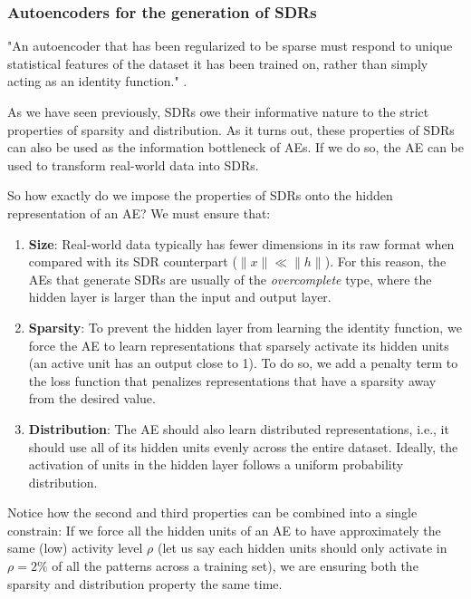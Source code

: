 \documentclass{article}
\begin{document}
\subsubsection{Autoencoders for the generation of SDRs}

"An autoencoder that has been regularized to be sparse must
respond to unique statistical features of the dataset it has been trained on, rather than simply acting as an identity function." \cite{bengio2017deep}.

As we have seen previously, SDRs owe their informative nature to the strict properties of sparsity and distribution. As it turns out, these properties of SDRs can also be used as the information bottleneck of AEs. If we do so, the AE can be used to transform real-world data into SDRs.

So how exactly do we impose the properties of SDRs onto the hidden representation of an AE? We must ensure that:
\begin{enumerate}
    \item \textbf{Size}: Real-world data typically has fewer dimensions in its raw format when compared with its SDR counterpart ($\|x\| \ll \|h\|$). For this reason, the AEs that generate SDRs are usually of the \textit{overcomplete} type, where the hidden layer is larger than the input and output layer.
    
    \item \textbf{Sparsity}: To prevent the hidden layer from learning the identity function, we force the AE to learn representations that sparsely activate its hidden units (an active unit has an output close to 1). To do so, we add a penalty term to the loss function that penalizes representations that have a sparsity away from the desired value.
    
    \item \textbf{Distribution}: The AE should also learn distributed representations, i.e., it should use all of its hidden units evenly across the entire dataset. Ideally, the activation of units in the hidden layer follows a uniform probability distribution.
\end{enumerate}

Notice how the second and third properties can be combined into a single constrain: If we force all the hidden units of an AE to have approximately the same (low) activity level $\rho$ (let us say each hidden units should only activate in $\rho=2\%$ of all the patterns across a training set), we are ensuring both the sparsity and distribution property the same time.
\end{document}
